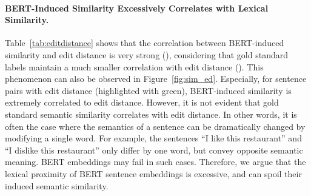 \documentclass[11pt,a4paper]{article}
\begin{document}
\paragraph{BERT-Induced Similarity Excessively Correlates with Lexical Similarity.}






\begin{table}[!t]
\centering
{}
\caption{\label{tab:editdistance} Spearman's correlation  between various sentence similarities on the validation set of STS-B. We can observe that BERT-induced similarity is highly correlated to edit distance, while the correlation with edit distance is less evident for gold standard or flow-induced similarity. }
\end{table}



Table~\ref{tab:editdistance} shows that the correlation between BERT-induced similarity and edit distance is very strong (), considering that gold standard labels maintain a much smaller correlation with edit distance (\textbf{}). This phenomenon can also be observed in Figure~\ref{fig:sim_ed}. 
Especially, for sentence pairs with edit distance  (highlighted with {\color{green} green}), BERT-induced similarity is extremely correlated to edit distance. However, it is not evident that gold standard semantic similarity correlates with edit distance. In other words, it is often the case where the semantics of a sentence can be dramatically changed by modifying a single word. For example, the sentences ``I like this restaurant'' and ``I dislike this restaurant'' only differ by one word, but convey opposite semantic meaning. BERT embeddings may fail in such cases. Therefore, we argue that the lexical proximity of BERT sentence embeddings is excessive, and can spoil their induced semantic similarity. 
\end{document}
